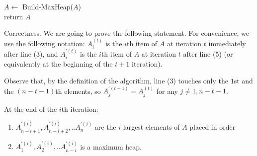\begin{algorithm}
    $A \leftarrow$ Build-MaxHeap($A$)\\
	  return $A$
\caption{Heap-sort$(A)$}
  \label{alg:heapsort} 
  \end{algorithm}
  Correctness. We are going to prove the following statement. For convenience, we use the following notation: $A^{(t)}_{i}$ is the $i$th item of $A$ at iteration $t$ immediately after line (3), and $A^{\prime (t)}_{i}$ is the $i$th item of $A$ at iteration $t$ after line (5) (or equivalently at the beginning of the $t+1$ iteration).

  Observe that, by the definition of the algorithm, line (3) touches only the $1$st and the $(n-t-1)$th elements, so $A^{\prime (t-1)}_{j} = A^{(t)}_{j}$ for any $j \neq 1, n-t-1$.
  \begin{claim}   
At the end of the $i$th iteration:
\begin{enumerate}
  \item $A^{\prime(i)}_{n-i+1},A^{\prime(i)}_{n-i+2},..A^{\prime(i)}_{n}$ are the $i$ largest elements of $A$ placed in order
    \item $A^{\prime(i)}_{1},A^{\prime(i)}_{2},..A^{\prime(i)}_{n-i}$ is a maximum heap.
\end{enumerate}
  \end{claim}
